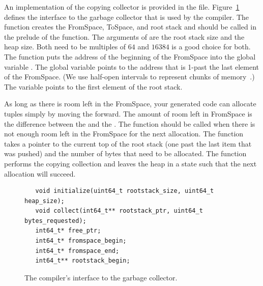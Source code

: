 \documentclass[11pt]{book}
\begin{document}
An implementation of the copying collector is provided in the
 file. Figure~\ref{fig:gc-header} defines the
interface to the garbage collector that is used by the compiler. The
 function creates the FromSpace, ToSpace, and root
stack and should be called in the prelude of the 
function. The arguments of  are the root stack size
and the heap size. Both need to be multiples of $64$ and $16384$ is a
good choice for both.  The  function puts the address
of the beginning of the FromSpace into the global variable
. The global variable  points to
the address that is 1-past the last element of the FromSpace. (We use
half-open intervals to represent chunks of
memory~\citep{Dijkstra:1982aa}.)  The  variable
points to the first element of the root stack.

As long as there is room left in the FromSpace, your generated code
can allocate tuples simply by moving the  forward.
%
The amount of room left in FromSpace is the difference between the
 and the .  The 
function should be called when there is not enough room left in the
FromSpace for the next allocation.  The  function takes
a pointer to the current top of the root stack (one past the last item
that was pushed) and the number of bytes that need to be
allocated. The  function performs the copying collection
and leaves the heap in a state such that the next allocation will
succeed.

\begin{figure}[tbp]
\begin{lstlisting}
   void initialize(uint64_t rootstack_size, uint64_t heap_size);
   void collect(int64_t** rootstack_ptr, uint64_t bytes_requested);
   int64_t* free_ptr;
   int64_t* fromspace_begin;
   int64_t* fromspace_end;
   int64_t** rootstack_begin;
\end{lstlisting}
\caption{The compiler's interface to the garbage collector.}
\label{fig:gc-header}
\end{figure}
\end{document}
